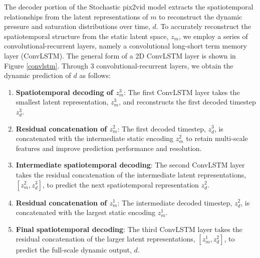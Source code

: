 \documentclass[10pt, twoside]{article}
\begin{document}
The decoder portion of the Stochastic pix2vid model extracts the spatiotemporal relationships from the latent representations of $m$ to reconstruct the dynamic pressure and saturation distributions over time, $d$. To accurately reconstruct the spatiotemporal structure from the static latent space, $z_m$, we employ a series of convolutional-recurrent layers, namely a convolutional long-short term memory layer (ConvLSTM). The general form of a 2D ConvLSTM layer is shown in Figure \ref{convlstm}. Through 3 convolutional-recurrent layers, we obtain the dynamic prediction of $d$ as follows:

\begin{enumerate}[Step 1:]
    \item \textbf{Spatiotemporal decoding of $z_m^3$}: The first ConvLSTM layer takes the smallest latent representation, $z_m^3$, and reconstructs the first decoded timestep $z_d^3$.
    
    \item \textbf{Residual concatenation of $z_m^2$}: The first decoded timestep, $z_d^3$, is concatenated with the intermediate static encoding $z_m^2$ to retain multi-scale features and improve prediction performance and resolution.
    
    \item \textbf{Intermediate spatiotemporal decoding}: The second ConvLSTM layer takes the residual concatenation of the intermediate latent representations, $[z_m^2,z_d^3]$, to predict the next spatiotemporal representation $z_d^2$. 
    
    \item \textbf{Residual concatenation of $z_m^1$}: The intermediate decoded timestep, $z_d^2$, is concatenated with the largest static encoding $z_m^1$.
    
    \item \textbf{Final spatiotemporal decoding}: The third ConvLSTM layer takes the residual concatenation of the larger latent representations, $[z_m^1,z_d^2]$, to predict the full-scale dynamic output, $d$.
\end{enumerate}
\end{document}
